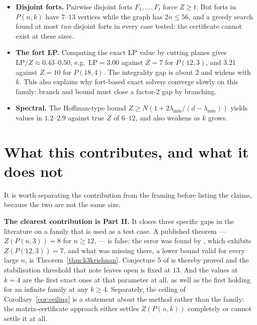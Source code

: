 \documentclass[11pt]{article}
\theoremstyle{definition}
\begin{document}
\begin{itemize}
\item \textbf{Disjoint forts.} Pairwise disjoint forts $F_1,\dots,F_t$ force
$Z\ge t$. But forts in $P(n,k)$ have $7$--$13$ vertices while the graph has
$2n\le56$, and a greedy search found at most \emph{two} disjoint forts in
every case tested: the certificate cannot exist at these sizes.
\item \textbf{The fort LP.} Computing the exact LP value by cutting planes
gives $\mathrm{LP}/Z\approx0.43$--$0.50$, e.g.\ $\mathrm{LP}=3.00$ against
$Z=7$ for $P(12,3)$, and $3.21$ against $Z=10$ for $P(18,4)$. The integrality
gap is about $2$ and widens with $k$. This also explains why fort-based exact
solvers converge slowly on this family: branch and bound must close a factor-2
gap by branching.
\item \textbf{Spectral.} The Hoffman-type bound
$Z\ge N(1+2\lambda_{\min}/(d-\lambda_{\min}))$ yields values in $1.2$--$2.9$
against true $Z$ of $6$--$12$, and also weakens as $k$ grows.
\end{itemize}

\section{What this contributes, and what it does not}\label{sec:contribution}

It is worth separating the contribution from the framing before listing the
claims, because the two are not the same size.

\textbf{The clearest contribution is Part II.} It closes three specific gaps in
the literature on a family that is used as a test case. A published
theorem --- $Z(P(n,3))=8$ for $n\ge12$, \cite[Thm.~3.6]{RST} --- is false;
the error was found by \cite{K}, which exhibits $Z(P(12,3))=7$, and what was
missing there, a lower bound valid for every large $n$, is
Theorem~\ref{thm:k3krishnan}. Conjecture 5 of \cite{K} is thereby proved and
the stabilisation threshold that note leaves open is fixed at $13$. And the
values at $k=4$ are the first exact ones at that parameter at all, as well as
the first holding for an infinite family at any $k\ge4$. Separately, the
ceiling of Corollary~\ref{cor:ceiling} is a statement about the method rather
than the family: the matrix-certificate approach either settles $Z(P(n,k))$
completely or cannot settle it at all.
\end{document}
